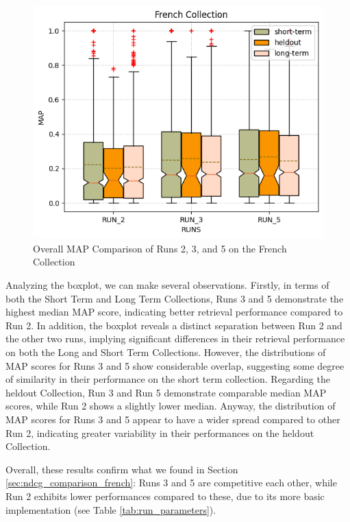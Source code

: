 \begin{figure}[!h]
    \centering
    \includegraphics[width=\linewidth]{figure/StatisticalAnalysis/BoxPlot/MAP French.png}
    \caption{Overall MAP Comparison of Runs 2, 3, and 5 on the French Collection}
    \label{fig:map_french}
\end{figure}

Analyzing the boxplot, we can make several observations. 
Firstly, in terms of both the Short Term and Long Term Collections, Runs 3 and 5 demonstrate the highest median \ac{MAP} score, indicating better retrieval performance compared to Run 2. 
In addition, the boxplot reveals a distinct separation between Run 2 and the other two runs, implying significant differences in their retrieval performance on both the Long and Short Term Collections.
However, the distributions of \ac{MAP} scores for Runs 3 and 5 show considerable overlap, suggesting some degree of similarity in their performance on the short term collection.
Regarding the heldout Collection, Run 3 and Run 5 demonstrate comparable median \ac{MAP} scores, while Run 2 shows a slightly lower median. 
Anyway, the distribution of \ac{MAP} scores for Runs 3 and 5 appear to have a wider spread compared to other Run 2, indicating greater variability in their performances on the heldout Collection.

Overall, these results confirm what we found in Section \ref{sec:ndcg_comparison_french}: Runs 3 and 5 are competitive each other, while Run 2 exhibits lower performances compared to these, due to its more basic implementation (see Table \ref{tab:run_parameters}). 

